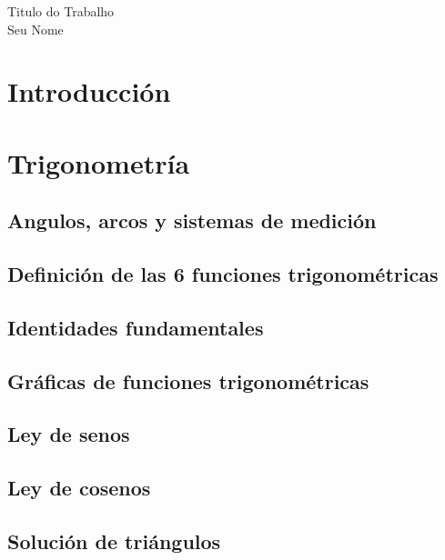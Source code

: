 \documentclass[12pt]{article}
\begin{document}
\begin{titlepage}
    \begin{center}
       
        {\Huge Titulo do Trabalho} \\[4.9cm]
        {\large Seu Nome} \\[3.5cm]
        \vfill
    \end{center}
\end{titlepage}

\tableofcontents
\cleardoublepage

\section*{Introducción}

\newpage
\section{Trigonometría}

\subsection{Angulos, arcos y sistemas de medición}

\subsection{Definición de las 6 funciones trigonométricas}

\subsection{Identidades fundamentales}

\subsection{Gráficas de funciones trigonométricas}

\subsection{Ley de senos}

\subsection{Ley de cosenos}

\subsection{Solución de triángulos}
\end{document}

